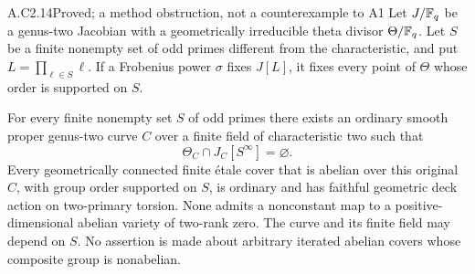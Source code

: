 \begin{claim}{A.C2.14}{Proved; a method obstruction, not a counterexample to A1}
Let $J/\mathbb F_q$ be a genus-two Jacobian with a geometrically irreducible
theta divisor $\Theta/\mathbb F_q$. Let $S$ be a finite nonempty set of odd
primes different from the characteristic, and put $L=\prod_{\ell\in S}\ell$.
If a Frobenius power $\sigma$ fixes $J[L]$, it fixes every point
of $\Theta$ whose order is supported on $S$.

For every finite nonempty set $S$ of odd primes there exists an
ordinary smooth proper genus-two curve $C$ over a finite field of
characteristic two such that
\[
                    \Theta_C\cap J_C[S^\infty]=\varnothing.
                                                                    \tag{C2.35}
\]
Every geometrically connected finite \'etale cover that is abelian
over this original $C$, with group order supported on $S$, is
ordinary and has faithful geometric deck action on two-primary
torsion. None admits a nonconstant map to a positive-dimensional
abelian variety of two-rank zero. The curve and its finite field
may depend on $S$. No assertion is made about arbitrary iterated
abelian covers whose composite group is nonabelian.
\end{claim}
